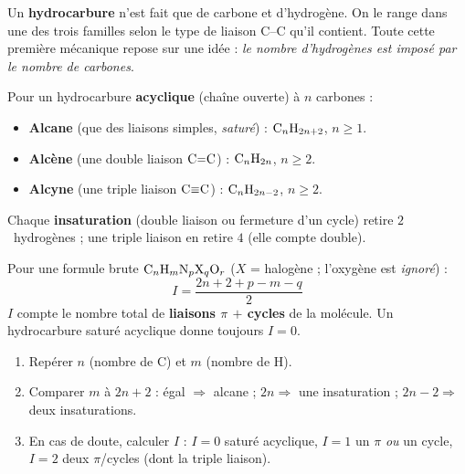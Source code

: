 \documentclass[11pt,a4paper]{article}
\begin{document}

Un \textbf{hydrocarbure} n'est fait que de carbone et d'hydrogène. On le range dans une des trois familles selon le type de liaison C--C qu'il contient. Toute cette première mécanique repose sur une idée : \emph{le nombre d'hydrogènes est imposé par le nombre de carbones}.

\begin{cle}
Pour un hydrocarbure \textbf{acyclique} (chaîne ouverte) à $n$ carbones :
\begin{itemize}[leftmargin=1.6em,itemsep=1pt]
  \item \textbf{Alcane} (que des liaisons simples, \emph{saturé}) : $\ce{C_nH_{2n+2}}$, $n\geq 1$.
  \item \textbf{Alcène} (une double liaison $\ce{C=C}$) : $\ce{C_nH_{2n}}$, $n\geq 2$.
  \item \textbf{Alcyne} (une triple liaison $\ce{C#C}$) : $\ce{C_nH_{2n-2}}$, $n\geq 2$.
\end{itemize}
Chaque \textbf{insaturation} (double liaison ou fermeture d'un cycle) retire $2$~hydrogènes ; une triple liaison en retire $4$ (elle compte double).
\end{cle}

\begin{cle}
Pour une formule brute $\ce{C_nH_mN_pX_qO_r}$ ($X$ = halogène ; l'oxygène est \emph{ignoré}) :
\[
\boxed{\,I=\dfrac{2n+2+p-m-q}{2}\,}
\]
$I$ compte le nombre total de \textbf{liaisons $\pi$ $+$ cycles} de la molécule. Un hydrocarbure saturé acyclique donne toujours $I=0$.
\end{cle}

\begin{methode}
\begin{enumerate}[leftmargin=1.6em,itemsep=1pt]
  \item Repérer $n$ (nombre de C) et $m$ (nombre de H).
  \item Comparer $m$ à $2n+2$ : \; égal $\Rightarrow$ alcane ; \; $2n \Rightarrow$ une insaturation ; \; $2n-2 \Rightarrow$ deux insaturations.
  \item En cas de doute, calculer $I$ : $I=0$ saturé acyclique, $I=1$ un $\pi$ \emph{ou} un cycle, $I=2$ deux $\pi$/cycles (dont la triple liaison).
\end{enumerate}
\end{methode}
\end{document}
